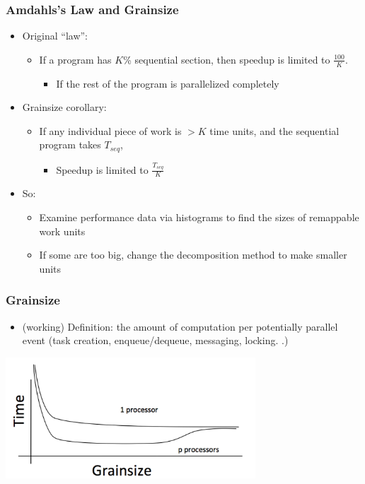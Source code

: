 
\begin{frame}
  \frametitle{Amdahls’s Law and Grainsize}
  \begin{itemize}
    \item Original ``law'':
      \begin{itemize}
      \item If a program has $K$\% sequential section, then speedup is limited
        to $\frac{100}{K}$.
        \begin{itemize}
        \item If the rest of the program is parallelized completely
        \end{itemize}
      \end{itemize}
    \item Grainsize corollary:
      \begin{itemize}
      \item If any individual piece of work is $> K$ time units, and the
        sequential program takes $T_{seq}$, 
        \begin{itemize}
        \item Speedup is limited to $\frac{T_{seq}}{K}$
        \end{itemize}
      \end{itemize}
    \item So:
      \begin{itemize}
      \item Examine performance data via histograms to find the sizes of
        remappable work units
      \item If some are too big, change the decomposition method to make
        smaller units
      \end{itemize}
  \end{itemize}
\end{frame}

\begin{frame}
  \frametitle{Grainsize}
  \begin{itemize}
    \item (working) Definition: the amount of computation per potentially
      parallel event (task creation, enqueue/dequeue, messaging, locking. .)
  \end{itemize}
  \begin{center} \includegraphics[width=0.7\textwidth]{figures/grain1.png} \end{center}
\end{frame}

